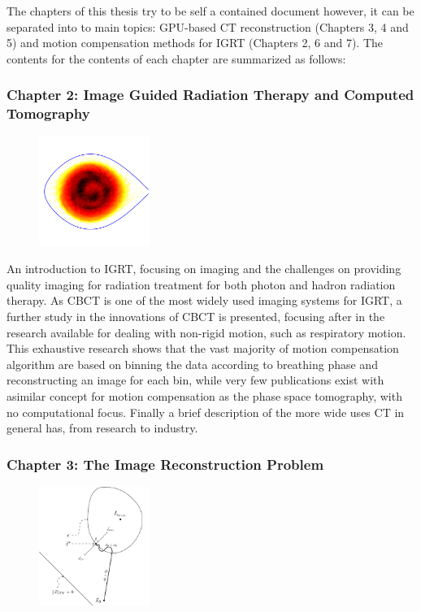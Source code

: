 The chapters of this thesis try to be self a contained document however, it can be separated into to main topics: GPU-based CT reconstruction (Chapters 3, 4 and 5) and motion compensation methods for IGRT (Chapters 2, 6 and 7). The contents for the contents of each chapter are summarized as follows:

\subsubsection{Chapter 2: Image Guided Radiation Therapy and Computed Tomography}


\begin{figure}
\centering
\includegraphics[width=0.32\textwidth]{StateOfArt/pst.png}
\end{figure}

An introduction to IGRT, focusing on imaging and the challenges on providing quality imaging for radiation treatment for both photon and hadron radiation therapy. As CBCT is one of the most widely used imaging systems for IGRT, a further study in the innovations of CBCT is presented, focusing after in the research available for dealing with non-rigid motion, such as respiratory motion. This exhaustive research shows that the vast majority of motion compensation algorithm are based on binning the data according to breathing phase and reconstructing an image for each bin, while very few publications exist with asimilar concept for motion compensation as the phase space tomography, with no computational focus. Finally a brief description of the more wide uses CT in general has, from research to industry.

\vspace{40pt}
\subsubsection{Chapter 3: The Image Reconstruction Problem}

\begin{figure}
\centering
\includegraphics[width=0.32\textwidth]{RecAlgorithms/POCS.pdf}
\end{figure}

